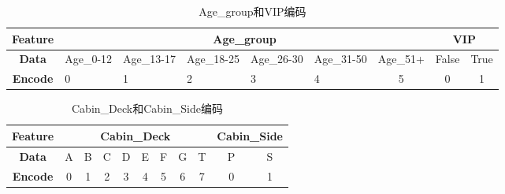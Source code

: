 \documentclass[../main.tex]{subfiles}
\begin{document}
            \begin{table}[H]
                \centering
                \footnotesize
                \begin{tabular}{|c|cccccc|cc|}
                \hline
                \textbf{Feature} & \multicolumn{6}{c|}{\textbf{Age\_group}}                                                                                                                                           & \multicolumn{2}{c|}{\textbf{VIP}} \\ \hline
                \textbf{Data}    & \multicolumn{1}{l|}{Age\_0-12} & \multicolumn{1}{l|}{Age\_13-17} & \multicolumn{1}{l|}{Age\_18-25} & \multicolumn{1}{l|}{Age\_26-30} & \multicolumn{1}{l|}{Age\_31-50} & Age\_51+  & \multicolumn{1}{c|}{False} & True \\ \hline
                \textbf{Encode}  & \multicolumn{1}{l|}{0}         & \multicolumn{1}{l|}{1}          & \multicolumn{1}{l|}{2}          & \multicolumn{1}{l|}{3}          & \multicolumn{1}{l|}{4}          & 5         & \multicolumn{1}{c|}{0}     & 1    \\ \hline
                \end{tabular}
                \caption{Age\_group和VIP编码}
            \end{table}

            \begin{table}[H]
                \centering
                \footnotesize
                \begin{tabular}{|c|cccccccc|cc|}
                \hline
                \textbf{Feature} & \multicolumn{8}{c|}{\textbf{Cabin\_Deck}}                                                                                                                                        & \multicolumn{2}{c|}{\textbf{Cabin\_Side}} \\ \hline
                \textbf{Data}    & \multicolumn{1}{c|}{A} & \multicolumn{1}{c|}{B} & \multicolumn{1}{c|}{C} & \multicolumn{1}{c|}{D} & \multicolumn{1}{c|}{E} & \multicolumn{1}{c|}{F} & \multicolumn{1}{c|}{G} & T & \multicolumn{1}{c|}{P}         & S        \\ \hline
                \textbf{Encode}  & \multicolumn{1}{c|}{0} & \multicolumn{1}{c|}{1} & \multicolumn{1}{c|}{2} & \multicolumn{1}{c|}{3} & \multicolumn{1}{c|}{4} & \multicolumn{1}{c|}{5} & \multicolumn{1}{c|}{6} & 7 & \multicolumn{1}{c|}{0}         & 1        \\ \hline
                \end{tabular}
                \caption{Cabin\_Deck和Cabin\_Side编码}
            \end{table}
\end{document}
